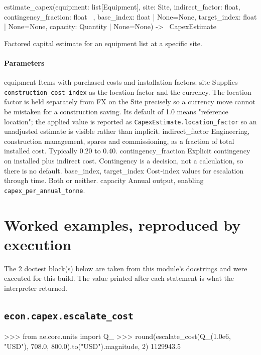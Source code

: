 \documentclass[10pt,a4paper,twoside]{report}
\begin{document}
\begin{verbatimsmall}
estimate_capex(equipment: list[Equipment], site: Site, indirect_factor: float, contingency_fraction: float
    \ , base_index: float | None=None, target_index: float | None=None, capacity: Quantity | None=None) ->
    \  CapexEstimate
\end{verbatimsmall}

Factored capital estimate for an equipment list at a specific site.

\paragraph*{Parameters}

equipment Items with purchased costs and installation factors. site Supplies \texttt{construction\_cost\_index} as the location factor and the currency. The location factor is held separately from FX on the Site precisely so a currency move cannot be mistaken for a construction saving. Its default of 1.0 means "reference location"; the applied value is reported as \texttt{CapexEstimate.location\_factor} so an unadjusted estimate is visible rather than implicit. indirect\_factor Engineering, construction management, spares and commissioning, as a fraction of total installed cost. Typically 0.20 to 0.40. contingency\_fraction Explicit contingency on installed plus indirect cost. Contingency is a decision, not a calculation, so there is no default. base\_index, target\_index Cost-index values for escalation through time. Both or neither. capacity Annual output, enabling \texttt{capex\_per\_annual\_tonne}.

\section{Worked examples, reproduced by execution}

The 2 doctest block(s) below are taken from this module's docstrings and were executed for this build. The value printed after each statement is what the interpreter returned.

\subsection*{\texttt{econ.capex.escalate\_cost}}

\begin{doctestblock}
>>> from ae.core.units import Q_
>>> round(escalate_cost(Q_(1.0e6, "USD"), 708.0, 800.0).to("USD").magnitude, 2)
1129943.5
\end{doctestblock}
\end{document}
